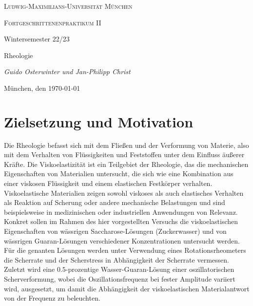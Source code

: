 \documentclass[11pt,a4paper,oneside]{scrartcl}
\begin{document}
\begin{titlepage}
	\centering
	{\scshape\LARGE Ludwig-Maximilians-Universität \linebreak München \par}
	\vspace{1cm}
	{\scshape\Large Fortgeschrittenenpraktikum II \par Wintersemester 22/23 \par}
	\vspace{1.5cm}
	{\huge\bfseries \par  Rheologie\par}
	\vspace{2cm}
	{\Large\itshape Guido Osterwinter und Jan-Philipp Christ \par}
	\vfill
	{\Large München, den \today\par}
	
\end{titlepage}

\tableofcontents
\newpage
\section{Zielsetzung und Motivation}

Die Rheologie befasst sich mit dem Fließen und der Verformung von Materie, also mit dem Verhalten von Flüssigkeiten und Feststoffen unter dem Einfluss äußerer Kräfte. Die Viskoelastizität ist ein Teilgebiet der Rheologie, das die mechanischen Eigenschaften von Materialien untersucht, die sich wie eine Kombination aus einer viskosen Flüssigkeit und einem elastischen Festkörper verhalten. Viskoelastische Materialien zeigen sowohl viskoses als auch elastisches Verhalten als Reaktion auf Scherung oder andere mechanische Belastungen und sind beispielsweise in medizinischen oder industriellen Anwendungen von Relevanz.\\
Konkret sollen im Rahmen des hier vorgestellten Versuchs die viskoelastischen Eigenschaften von wässrigen Saccharose-Lösungen (Zuckerwasser) und von wässrigen Guaran-Lösungen verschiedener Konzentrationen untersucht werden. Für die genanten Lösungen werden unter Verwendung eines Rotationsrheometers die Scherrate und der Scherstress  in Abhängigkeit der Scherrate vermessen.\\
Zuletzt wird eine $0.5$-prozentige Wasser-Guaran-Lösung einer oszillatorischen Scherverformung, wobei die Oszillationsfrequenz bei fester Amplitude variiert wird, ausgesetzt, um damit die Abhängigkeit der viskoelastischen Materialantwort  von der Frequenz zu beleuchten.
\end{document}
